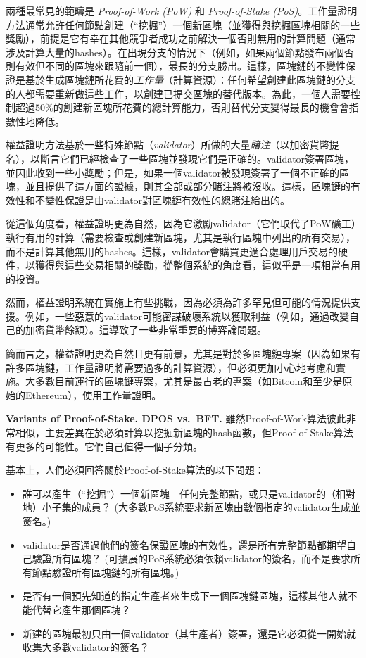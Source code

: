 \documentclass[12pt,oneside]{article}
\def\makepoint#1{\medbreak\noindent{\bf #1.\ }}
\def\nxsubpoint{\refstepcounter{subsubsection}%
  \smallbreak\makepoint{\thesubsubsection}}
\def\embt(#1.){\textbf{#1.}}
\begin{document}
兩種最常見的範疇是 {\em Proof-of-Work (PoW)} 和 {\em Proof-of-Stake (PoS)}。工作量證明方法通常允許任何節點創建（“挖掘”）一個新區塊（並獲得與挖掘區塊相關的一些獎勵），前提是它有幸在其他競爭者成功之前解決一個否則無用的計算問題（通常涉及計算大量的hashes）。在出現分支的情況下（例如，如果兩個節點發布兩個否則有效但不同的區塊來跟隨前一個），最長的分支勝出。這樣，區塊鏈的不變性保證是基於生成區塊鏈所花費的{\em 工作量}（計算資源）：任何希望創建此區塊鏈的分支的人都需要重新做這些工作，以創建已提交區塊的替代版本。為此，一個人需要控制超過$50\%$的創建新區塊所花費的總計算能力，否則替代分支變得最長的機會會指數性地降低。

權益證明方法基於一些特殊節點（{\em validator}）所做的大量{\em 賭注}（以加密貨幣提名），以斷言它們已經檢查了一些區塊並發現它們是正確的。validator簽署區塊，並因此收到一些小獎勵；但是，如果一個validator被發現簽署了一個不正確的區塊，並且提供了這方面的證據，則其全部或部分賭注將被沒收。這樣，區塊鏈的有效性和不變性保證是由validator對區塊鏈有效性的總賭注給出的。

從這個角度看，權益證明更為自然，因為它激勵validator（它們取代了PoW礦工）執行有用的計算（需要檢查或創建新區塊，尤其是執行區塊中列出的所有交易），而不是計算其他無用的hashes。這樣，validator會購買更適合處理用戶交易的硬件，以獲得與這些交易相關的獎勵，從整個系統的角度看，這似乎是一項相當有用的投資。

然而，權益證明系統在實施上有些挑戰，因為必須為許多罕見但可能的情況提供支援。例如，一些惡意的validator可能密謀破壞系統以獲取利益（例如，通過改變自己的加密貨幣餘額）。這導致了一些非常重要的博弈論問題。

簡而言之，權益證明更為自然且更有前景，尤其是對於多區塊鏈專案（因為如果有許多區塊鏈，工作量證明將需要過多的計算資源），但必須更加小心地考慮和實施。大多數目前運行的區塊鏈專案，尤其是最古老的專案（如Bitcoin和至少是原始的Ethereum），使用工作量證明。

\nxsubpoint\label{sp:dpos.bft} \embt(Variants of Proof-of-Stake. DPOS
vs.\ BFT.) 雖然Proof-of-Work算法彼此非常相似，主要差異在於必須計算以挖掘新區塊的hash函數，但Proof-of-Stake算法有更多的可能性。它們自己值得一個子分類。

基本上，人們必須回答關於Proof-of-Stake算法的以下問題：
\begin{itemize}
\item 誰可以產生（“挖掘”）一個新區塊 - 任何完整節點，或只是validator的（相對地）小子集的成員？ (大多數PoS系統要求新區塊由數個指定的validator生成並簽名。)
\item validator是否通過他們的簽名保證區塊的有效性，還是所有完整節點都期望自己驗證所有區塊？ (可擴展的PoS系統必須依賴validator的簽名，而不是要求所有節點驗證所有區塊鏈的所有區塊。)
\item 是否有一個預先知道的指定生產者來生成下一個區塊鏈區塊，這樣其他人就不能代替它產生那個區塊？
\item 新建的區塊最初只由一個validator（其生產者）簽署，還是它必須從一開始就收集大多數validator的簽名？
\end{itemize}
\end{document}
